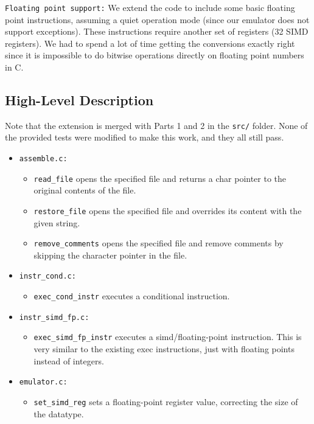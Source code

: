 \documentclass[11pt]{article}
\begin{document}
\verb|Floating point support:| We extend the code to include some basic floating point instructions, assuming a quiet operation mode (since our emulator does not support exceptions).  These instructions require another set of registers (32 SIMD registers). We had to spend a lot of time getting the conversions exactly right since it is impossible to do bitwise operations directly on floating point numbers in C.

\subsection{High-Level Description}
Note that the extension is merged with Parts 1 and 2 in the \verb|src/| folder. None of the provided tests were modified to make this work, and they all still pass.
\begin{itemize}
        \item \verb|assemble.c:| 
        \begin{itemize}
        \item \verb|read_file| opens the specified file and returns a char pointer to the original contents of the file.
        
        \item \verb|restore_file| opens the specified file and overrides its content with the given string.

        \item \verb|remove_comments| opens the specified file and remove comments by skipping the character pointer in the file.
        \end{itemize}
        \item \verb|instr_cond.c:| 
        \begin{itemize}
        \item \verb|exec_cond_instr| executes a conditional instruction.
        \end{itemize}
        \item \verb|instr_simd_fp.c:| 
        \begin{itemize}
        \item \verb|exec_simd_fp_instr| executes a simd/floating-point instruction. This is very similar to the existing exec instructions, just with floating points instead of integers.
        \end{itemize}
        \item \verb|emulator.c:| 
        \begin{itemize}
        \item \verb|set_simd_reg| sets a floating-point register value, correcting the size of the datatype.
        

\end{itemize}
\end{itemize}
\end{document}
